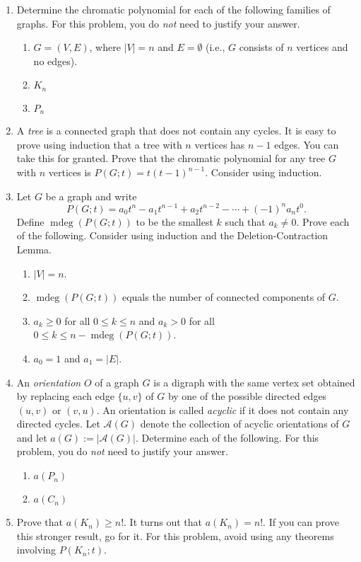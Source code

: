 \documentclass[11pt]{article}%
\theoremstyle{definition}
\DeclareMathOperator{\mdeg}{mdeg}
\DeclareRobustCommand{\rchi}{{\mathpalette\irchi\relax}}
\newcommand{\irchi}[2]{\raisebox{\depth}{$#1\chi$}}
\begin{document}
\begin{enumerate}

\item Determine the chromatic polynomial for each of the following families of graphs. For this problem, you do \emph{not} need to justify your answer.
\begin{enumerate}
\item $G=(V,E)$, where $|V|=n$ and $E=\emptyset$ (i.e., $G$ consists of $n$ vertices and no edges).
\item $K_n$
\item $P_n$
\end{enumerate}

\item A \emph{tree} is a connected graph that does not contain any cycles. It is easy to prove using induction that a tree with $n$ vertices has $n-1$ edges. You can take this for granted. Prove that the chromatic polynomial for any tree $G$ with $n$ vertices is $P(G;t)=t(t-1)^{n-1}$. Consider using induction.

\item Let $G$ be a graph and write
\[
P(G;t)=a_0t^n-a_1t^{n-1}+a_2t^{n-2}-\cdots +(-1)^na_nt^0.
\]
Define $\mdeg(P(G;t))$ to be the smallest $k$ such that $a_k\neq 0$. Prove each of the following. Consider using induction and the Deletion-Contraction Lemma.
\begin{enumerate}
\item $|V|=n$.
\item $\mdeg(P(G;t))$ equals the number of connected components of $G$.
\item $a_k\geq 0$ for all $0\leq k\leq n$ and $a_k>0$ for all $0\leq k\leq n-\mdeg(P(G;t))$.
\item $a_0=1$ and $a_1=|E|$.
\end{enumerate}

\item An \emph{orientation} $O$ of a graph $G$ is a digraph with the same vertex set obtained by replacing each edge $\{u,v\}$ of $G$ by one of the possible directed edges $(u,v)$ or $(v,u)$.  An orientation is called \emph{acyclic} if it does not contain any directed cycles.  Let $\mathcal{A}(G)$ denote the collection of acyclic orientations of $G$ and let $a(G):=|\mathcal{A}(G)|$. 
Determine each of the following. For this problem, you do \emph{not} need to justify your answer.
\begin{enumerate}
\item $a(P_n)$
\item $a(C_n)$
\end{enumerate}

\item Prove that $a(K_n)\geq n!$.  It turns out that $a(K_n)=n!$.  If you can prove this stronger result, go for it. For this problem, avoid using any theorems involving $P(K_n;t)$.

\end{enumerate}
\end{document}
